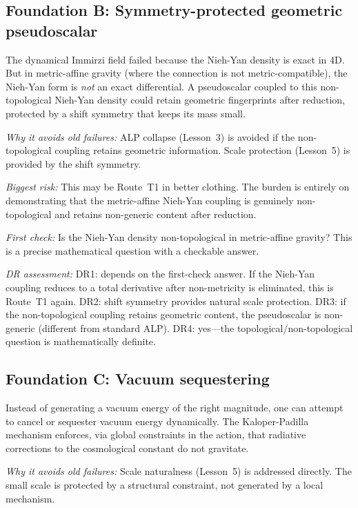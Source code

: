 \documentclass[aps,prd,twocolumn,superscriptaddress,showpacs,preprintnumbers,
  nofootinbib,longbibliography,floatfix]{revtex4-2}
\begin{document}
\subsection{Foundation B: Symmetry-protected geometric pseudoscalar}
\label{sec:foundB}

The dynamical Immirzi field failed because the Nieh-Yan density is exact
in 4D. But in metric-affine gravity (where the connection is not
metric-compatible), the Nieh-Yan form is \textit{not} an exact
differential. A pseudoscalar coupled to this non-topological Nieh-Yan
density could retain geometric fingerprints after reduction, protected
by a shift symmetry that keeps its mass small.

\textit{Why it avoids old failures:}
ALP collapse (Lesson~3) is avoided if the non-topological coupling
retains geometric information. Scale protection (Lesson~5) is provided
by the shift symmetry.

\textit{Biggest risk:}
This may be Route~T1 in better clothing. The burden is entirely on
demonstrating that the metric-affine Nieh-Yan coupling is genuinely
non-topological and retains non-generic content after reduction.

\textit{First check:}
Is the Nieh-Yan density non-topological in metric-affine gravity? This
is a precise mathematical question with a checkable answer.

\textit{DR assessment:}
DR1: depends on the first-check answer. If the Nieh-Yan coupling reduces
to a total derivative after non-metricity is eliminated, this is
Route~T1 again.
DR2: shift symmetry provides natural scale protection.
DR3: if the non-topological coupling retains geometric content, the
pseudoscalar is non-generic (different from standard ALP).
DR4: yes---the topological/non-topological question is mathematically
definite.

\subsection{Foundation C: Vacuum sequestering}\label{sec:foundC}

Instead of generating a vacuum energy of the right magnitude, one can
attempt to cancel or sequester vacuum energy dynamically. The
Kaloper-Padilla mechanism enforces, via global constraints in the action,
that radiative corrections to the cosmological constant do not gravitate.

\textit{Why it avoids old failures:}
Scale naturalness (Lesson~5) is addressed directly. The small scale is
protected by a structural constraint, not generated by a local mechanism.
\end{document}
